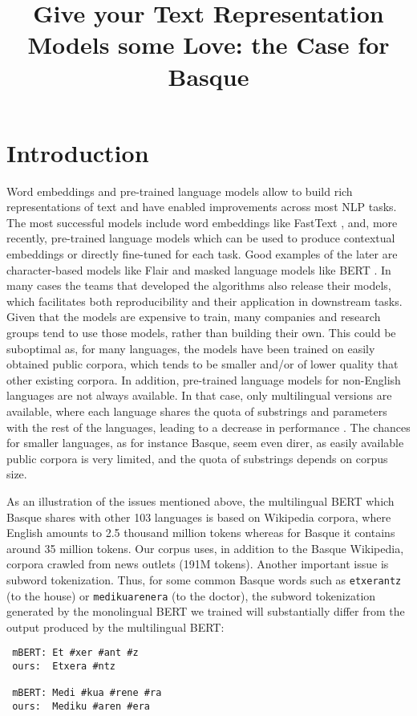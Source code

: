 \documentclass[10pt, a4paper]{article}
\title{Give your Text Representation Models some Love: the Case for Basque
}
\begin{document}
\maketitleabstract

\section{Introduction}\label{sec:introduction}

Word embeddings and pre-trained language models allow to build rich representations of text and have enabled improvements across most NLP tasks. The most successful models include word embeddings like FastText \cite{fasttext1_bojanowski2017enriching}, and, more recently, pre-trained language models which can be used to produce contextual embeddings or directly fine-tuned for each task. Good examples of the later are character-based models like Flair \cite{akbik2018coling} and masked language models like BERT \cite{devlin2019bert}. In many cases the teams that developed the algorithms also release their models, which facilitates both reproducibility and their application in downstream tasks. Given that the models are expensive to train, many companies and research groups tend to use those models, rather than building their own. This could be suboptimal as, for many languages, the models have been trained on easily obtained public corpora, which tends to be smaller and/or of lower quality that other existing corpora. In addition, pre-trained language models for non-English languages are not always available. In that case, only multilingual versions are available, where each language shares the quota of substrings and parameters with the rest of the languages, leading to a decrease in performance \cite{devlin2019bert}.  The chances for smaller languages, as for instance Basque, seem even direr, as easily available public corpora is very limited, and the quota of substrings depends on corpus size.

As an illustration of the issues mentioned above, the multilingual BERT which Basque shares with other 103 languages is based on Wikipedia corpora, where English amounts to 2.5 thousand million tokens whereas for Basque it contains around 35 million tokens. Our corpus uses, in addition to the Basque Wikipedia, corpora crawled from news outlets (191M tokens). Another important issue is subword tokenization. Thus, for some common Basque words such as \texttt{etxerantz} (to the house) or \texttt{medikuarenera} (to the doctor), the subword tokenization generated by the monolingual BERT we trained will substantially differ from the output produced by the multilingual BERT:

\begin{verbatim}
 mBERT: Et #xer #ant #z
 ours:  Etxera #ntz

 mBERT: Medi #kua #rene #ra
 ours:  Mediku #aren #era
\end{verbatim}
\end{document}
